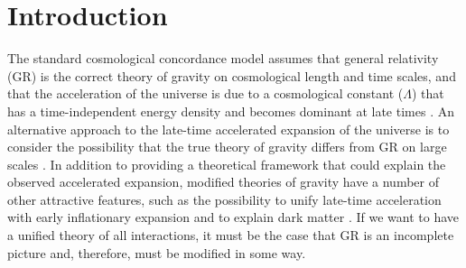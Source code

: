 \documentclass[prd,aps,psfig,nofootinbib,nobibnotes,superscriptaddress,preprintnumbers,times]{revtex4-2}\setlength{\topmargin}{-14mm}
\begin{document}
\section{Introduction}
The standard cosmological concordance model assumes that general relativity (GR) is the correct theory of gravity on cosmological length and time scales, and that the acceleration of the universe
is due to a cosmological constant ($\Lambda$) that has a time-independent energy density and becomes dominant at late times \cite{Copeland:2006wr, Peebles:2002gy}. 
An alternative approach to the late-time accelerated expansion of the universe is
to consider the possibility that the true theory of gravity differs from GR on large scales \cite{Clifton:2011jh, Nojiri:2017ncd, Joyce:2014kja, Planck:2015bue}. 
In addition to providing a theoretical framework that could explain the observed accelerated expansion, modified theories of gravity have a number of other attractive features, such as the possibility to unify late-time acceleration with early inflationary expansion \cite{Hinterbichler:2011tt,Clifton:2011jh,Nojiri:2010wj,Joyce:2014kja} 
and to explain dark matter \cite{Blas:2024jyh, Aoki:2016zgp}. 
If we want to have a unified theory of all interactions, it must be the case that GR is an incomplete picture and, therefore, must be modified in some way.
\end{document}
